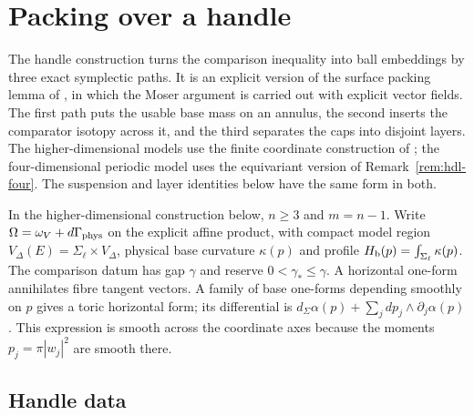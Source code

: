 \section{Packing over a handle}\label{sec:hdl}

The handle construction turns the comparison inequality into ball embeddings by three exact
symplectic paths. It is an explicit version of the surface packing lemma of \cite[\S3.2]{OpenAI2026}, in which the
Moser argument \cite{Moser1965} is carried out with explicit vector fields. The first path puts the usable base mass
on an annulus, the second inserts the comparator isotopy across it, and the third separates the caps into disjoint
layers. The higher-dimensional models use the finite coordinate construction of ; the
four-dimensional periodic model uses the equivariant version of Remark~\ref{rem:hdl-four}. The suspension and layer
identities below have the same form in both.

In the higher-dimensional construction below, $n\ge3$ and $m=n-1$. Write $\Omega=\omega_V+d\Gamma_{\rm phys}$ on the explicit affine product, with compact model region
$V_\Delta(E)=\Sigma_\ell\times V_\Delta$, physical base curvature $\kappa(p)$ and profile
$H_{\mathrm b}(p)=\int_{\Sigma_\ell}\kappa(p)$. The comparison datum has gap $\gamma$ and reserve
$0<\gamma_*\le\gamma$. A horizontal one-form annihilates fibre tangent vectors. A family of base
one-forms depending smoothly on $p$ gives a toric horizontal form; its differential is
$d_\Sigma\alpha(p)+\sum_jdp_j\wedge\partial_j\alpha(p)$. This expression is smooth across the
coordinate axes because the moments $p_j=\pi|w_j|^2$ are smooth there.

\subsection{Handle data}\label{sec:hdl-data}

